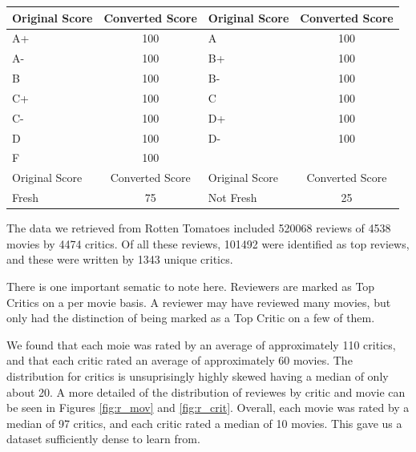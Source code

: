 \documentclass[12pt]{article}
\begin{document}
\begin{table}[H]
\centering
\begin{tabular}{ | l | c | l | c |}

\hline
Original Score & Converted Score & Original Score & Converted Score \\
\hline
A+ & 100 & A  & 100 \\
A- & 100 & B+ & 100 \\
B  & 100 & B- & 100 \\
C+ & 100 & C  & 100 \\
C- & 100 & D+ & 100 \\
D  & 100 & D- & 100 \\
F  & 100 &    &     \\
\hline
Original Score & Converted Score & Original Score & Converted Score \\
\hline
Fresh & 75 & Not Fresh & 25 \\
\hline
\end{tabular}
\label{tab:conv}
\end{table}

The data we retrieved from Rotten Tomatoes included 520068 reviews of 4538 
movies by 4474 critics. Of all these reviews, 101492 were identified as top 
reviews, and these were written by 1343 unique critics.

There is one important sematic to note here. Reviewers are marked as Top 
Critics on a per movie basis. A reviewer may have reviewed many movies, but 
only had the distinction of being marked as a Top Critic on a few of them. 

We found that each moie was rated by an average of approximately 110 critics, 
and that each critic rated an average of approximately 60 movies. 
The distribution for critics is unsuprisingly highly skewed having a median 
of only about 20. A more detailed of the distribution of reviewes by critic
and movie can be seen in Figures \ref{fig:r_mov} and \ref{fig:r_crit}.
Overall, each movie was rated by a median of 97 critics, and each critic rated 
a median of 10 movies. This gave us a dataset sufficiently dense to learn from.
\end{document}
